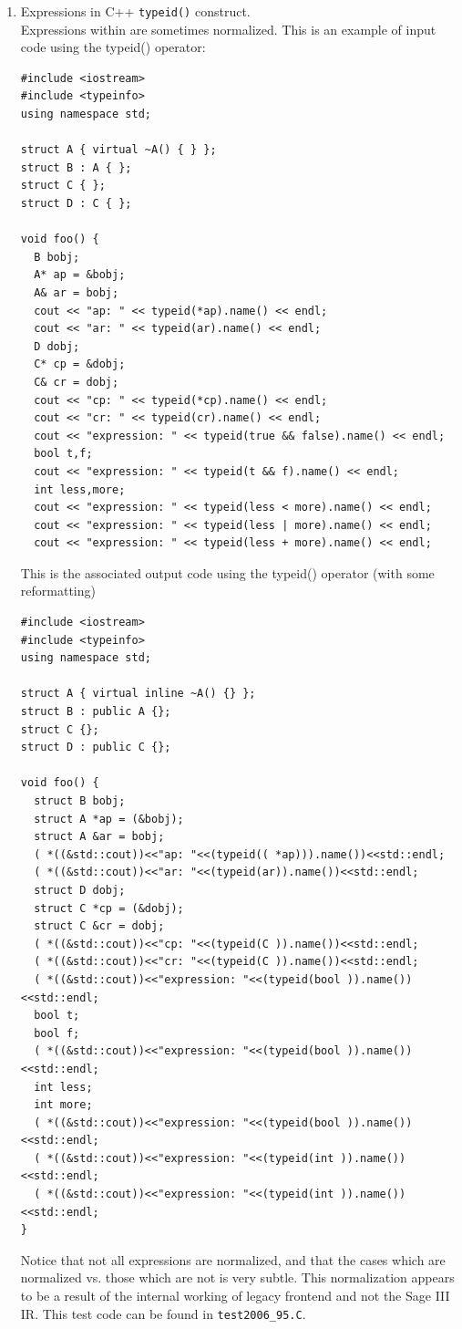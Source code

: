 \begin{enumerate}
\item Expressions in C++ {\tt typeid()} construct. \\
   Expressions within are sometimes normalized.
This is an example of input code using the typeid() operator:
{\indent
{\mySmallFontSize
\begin{verbatim}
#include <iostream>
#include <typeinfo>
using namespace std;

struct A { virtual ~A() { } };
struct B : A { };
struct C { };
struct D : C { };

void foo() {
  B bobj;
  A* ap = &bobj;
  A& ar = bobj;
  cout << "ap: " << typeid(*ap).name() << endl;
  cout << "ar: " << typeid(ar).name() << endl;
  D dobj;
  C* cp = &dobj;
  C& cr = dobj;
  cout << "cp: " << typeid(*cp).name() << endl;
  cout << "cr: " << typeid(cr).name() << endl;
  cout << "expression: " << typeid(true && false).name() << endl;
  bool t,f;
  cout << "expression: " << typeid(t && f).name() << endl;
  int less,more;
  cout << "expression: " << typeid(less < more).name() << endl;
  cout << "expression: " << typeid(less | more).name() << endl;
  cout << "expression: " << typeid(less + more).name() << endl;
\end{verbatim}
}}

This is the associated output code using the typeid() operator 
(with some reformatting)
{\indent
{\mySmallFontSize
\begin{verbatim}
#include <iostream>
#include <typeinfo>
using namespace std;

struct A { virtual inline ~A() {} };
struct B : public A {};
struct C {};
struct D : public C {};

void foo() {
  struct B bobj;
  struct A *ap = (&bobj);
  struct A &ar = bobj;
  ( *((&std::cout))<<"ap: "<<(typeid(( *ap))).name())<<std::endl;
  ( *((&std::cout))<<"ar: "<<(typeid(ar)).name())<<std::endl;
  struct D dobj;
  struct C *cp = (&dobj);
  struct C &cr = dobj;
  ( *((&std::cout))<<"cp: "<<(typeid(C )).name())<<std::endl;
  ( *((&std::cout))<<"cr: "<<(typeid(C )).name())<<std::endl;
  ( *((&std::cout))<<"expression: "<<(typeid(bool )).name())<<std::endl;
  bool t;
  bool f;
  ( *((&std::cout))<<"expression: "<<(typeid(bool )).name())<<std::endl;
  int less;
  int more;
  ( *((&std::cout))<<"expression: "<<(typeid(bool )).name())<<std::endl;
  ( *((&std::cout))<<"expression: "<<(typeid(int )).name())<<std::endl;
  ( *((&std::cout))<<"expression: "<<(typeid(int )).name())<<std::endl;
}
\end{verbatim}
}}

  Notice that not all expressions are normalized, and that the cases 
which are normalized vs. those which are not is very subtle. This 
normalization appears to be a result of the internal working of legacy frontend 
and not the Sage III IR.  This test code can be found in {\tt test2006\_95.C}.

\end{enumerate}


